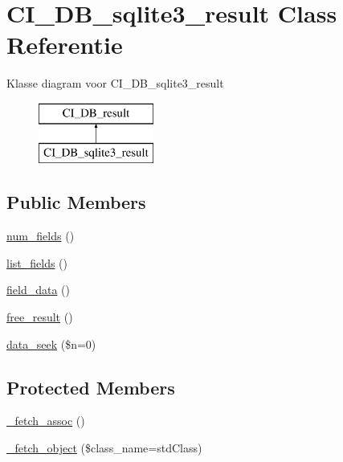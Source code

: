\hypertarget{class_c_i___d_b__sqlite3__result}{}\section{C\+I\+\_\+\+D\+B\+\_\+sqlite3\+\_\+result Class Referentie}
\label{class_c_i___d_b__sqlite3__result}
Klasse diagram voor C\+I\+\_\+\+D\+B\+\_\+sqlite3\+\_\+result\begin{figure}[H]
\begin{center}
\leavevmode
\includegraphics[height=2.000000cm]{class_c_i___d_b__sqlite3__result}
\end{center}
\end{figure}
\subsection*{Public Members}
\begin{DoxyCompactItemize}
\item 
\mbox{\hyperlink{class_c_i___d_b__sqlite3__result_af831bf363e4d7d661a717a4932af449d}{num\+\_\+fields}} ()
\item 
\mbox{\hyperlink{class_c_i___d_b__sqlite3__result_a50b54eb4ea7cfd039740f532988ea776}{list\+\_\+fields}} ()
\item 
\mbox{\hyperlink{class_c_i___d_b__sqlite3__result_a84bffd65e53902ade1591716749a33e3}{field\+\_\+data}} ()
\item 
\mbox{\hyperlink{class_c_i___d_b__sqlite3__result_aad2d98d6beb3d6095405356c6107b473}{free\+\_\+result}} ()
\item 
\mbox{\hyperlink{class_c_i___d_b__sqlite3__result_a8255ae91816e4206e29eb7581c5af0f1}{data\+\_\+seek}} (\$n=0)
\end{DoxyCompactItemize}
\subsection*{Protected Members}
\begin{DoxyCompactItemize}
\item 
\mbox{\hyperlink{class_c_i___d_b__sqlite3__result_a43a9a92817f1334a1c10752ec44275a0}{\+\_\+fetch\+\_\+assoc}} ()
\item 
\mbox{\hyperlink{class_c_i___d_b__sqlite3__result_a60806be6a9c2488820813c2a7f4fef71}{\+\_\+fetch\+\_\+object}} (\$class\+\_\+name=\textquotesingle{}std\+Class\textquotesingle{})
\end{DoxyCompactItemize}
